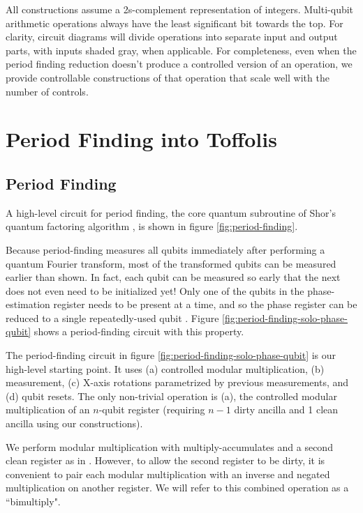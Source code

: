 \documentclass[twocolumn]{article}
\begin{document}
All constructions assume a 2s-complement representation of integers.
Multi-qubit arithmetic operations always have the least significant bit towards the top.
For clarity, circuit diagrams will divide operations into separate input and output parts, with inputs shaded gray, when applicable.
For completeness, even when the period finding reduction doesn't produce a controlled version of an operation, we provide controllable constructions of that operation that scale well with the number of controls.


\section{Period Finding into Toffolis} \label{sec:construct}

\subsection{Period Finding}

A high-level circuit for period finding, the core quantum subroutine of Shor's quantum factoring algorithm \cite{Shor1999}, is shown in figure \ref{fig:period-finding}.

Because period-finding measures all qubits immediately after performing a quantum Fourier transform, most of the transformed qubits can be measured earlier than shown.
In fact, each qubit can be measured so early that the next does not even need to be initialized yet!
Only one of the qubits in the phase-estimation register needs to be present at a time, and so the phase register can be reduced to a single repeatedly-used qubit \cite{beauregard2003}.
Figure \ref{fig:period-finding-solo-phase-qubit} shows a period-finding circuit with this property.

The period-finding circuit in figure \ref{fig:period-finding-solo-phase-qubit} is our high-level starting point.
It uses (a) controlled modular multiplication, (b) measurement, (c) X-axis rotations parametrized by previous measurements, and (d) qubit resets.
The only non-trivial operation is (a), the controlled modular multiplication of an $n$-qubit register (requiring $n-1$ dirty ancilla and 1 clean ancilla using our constructions).

We perform modular multiplication with multiply-accumulates and a second clean register as in \cite{beauregard2003}.
However, to allow the second register to be dirty, it is convenient to pair each modular multiplication with an inverse and negated multiplication on another register.
We will refer to this combined operation as a ``bimultiply".
\end{document}

